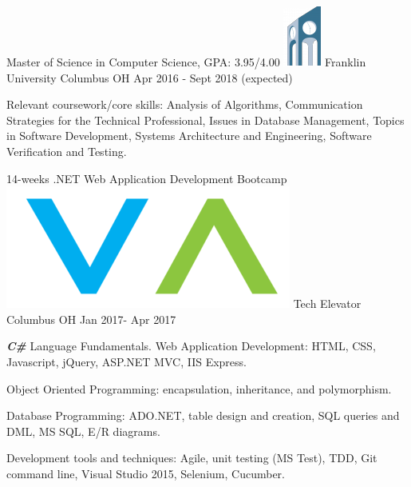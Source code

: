 \begin{cventries}
    \vspace{-2mm} \cventry
    {Master of Science in Computer Science, GPA: 3.95/4.00}
    {\includegraphics[scale=0.33]{img/franklinuniversity-190x75.png} Franklin University}
    {Columbus OH}
    {Apr 2016 - Sept 2018 (expected)}
    {
      \begin{cvitems}     
        \item {Relevant coursework/core skills: Analysis of Algorithms, Communication Strategies for the Technical Professional, Issues in Database Management, Topics in Software Development, Systems Architecture and Engineering, Software Verification and Testing.}\vspace{-2mm}     
      \end{cvitems}
    }
 \vspace{-2mm} \cventry
    {14-weeks .NET Web Application Development Bootcamp}
    {\includegraphics[scale=0.20]{img/download.png} Tech Elevator}
    {Columbus OH}
    {Jan 2017- Apr 2017}
    {
      \begin{cvitems}     
        \item {\textbf{\textit{C\#}} Language Fundamentals. Web Application Development: HTML, CSS, Javascript, jQuery, ASP.NET MVC, IIS Express.}
        \item {Object Oriented Programming: encapsulation, inheritance, and polymorphism.}
         \item {Database Programming: ADO.NET, table design and creation, SQL queries and DML, MS SQL, E/R diagrams.}
         \item {Development tools and techniques: Agile, unit testing (MS Test), TDD, Git command line, Visual Studio 2015, Selenium, Cucumber.}
      \end{cvitems}\vspace{-3mm}
}
\end{cventries}
